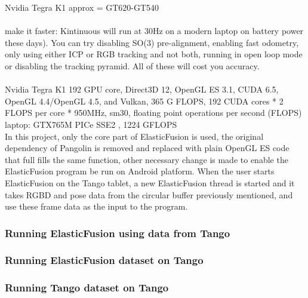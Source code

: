 \documentclass[12pt,twoside]{article}
\begin{document}
Nvidia Tegra K1  approx = GT620-GT540\\
\\
make it faster: Kintinuous will run at 30Hz on a modern laptop on battery power these days). You can try disabling SO(3) pre-alignment, enabling fast odometry, only using either ICP or RGB tracking and not both, running in open loop mode or disabling the tracking pyramid. All of these will cost you accuracy.\\
\\
Nvidia Tegra K1  192  GPU core, Direct3D 12, OpenGL ES 3.1, CUDA 6.5, OpenGL 4.4/OpenGL 4.5, and Vulkan, 365 G FLOPS, 192 CUDA cores * 2 FLOPS per core * 950MHz, sm30, floating point operations per second (FLOPS)\\
laptop: GTX765M PICe SSE2 , 1224 GFLOPS\\
In this project, only the core part of ElasticFusion is used, the original dependency of Pangolin is removed and replaced with plain OpenGL ES code that full fills the same function, other necessary change is made to enable the ElasticFusion program be run on Android platform. When the user starts ElasticFusion on the Tango tablet, a new ElasticFusion thread is started and it takes RGBD and pose data from the circular buffer previously mentioned, and use these frame data as the input to the program.\\




\subsubsection{Running ElasticFusion using data from Tango}







\subsubsection{Running ElasticFusion dataset on Tango}









\subsubsection{Running Tango dataset on Tango}
\end{document}
